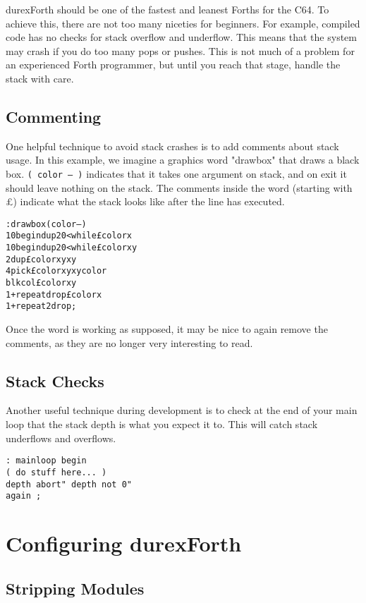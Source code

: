 durexForth should be one of the fastest and leanest Forths for the C64. To achieve this, there are
not too many niceties for beginners. For example, compiled code has no checks for stack overflow
and underflow. This means that the system may crash if you do too many pops or pushes. This is not
much of a problem for an experienced Forth programmer, but until you reach that stage, handle the
stack with care.

\subsection{Commenting}

One helpful technique to avoid stack crashes is to add comments about stack usage.
In this example, we imagine a graphics word "drawbox" that draws a black box.
\texttt{( color -- )} indicates that it takes one argument on stack, and on exit it should
leave nothing on the stack. The comments inside the word (starting with \pounds) indicate what the stack
looks like after the line has executed.

\begin{alltt}
: drawbox ( color -- )
10 begin dup 20 < while \pounds color x
10 begin dup 20 < while \pounds color x y
2dup \pounds color x y x y
4 pick \pounds color x y x y color
blkcol \pounds color x y
1+ repeat drop \pounds color x
1+ repeat 2drop ;
\end{alltt}

Once the word is working as supposed, it may be nice to again remove the comments, as
they are no longer very interesting to read.

\subsection{Stack Checks}

Another useful technique during development is to check at the end of your main loop
that the stack depth is what you expect it to. This will catch stack underflows
and overflows.

\begin{verbatim}
: mainloop begin
( do stuff here... )
depth abort" depth not 0"
again ;
\end{verbatim}

\section{Configuring durexForth}

\subsection{Stripping Modules}

